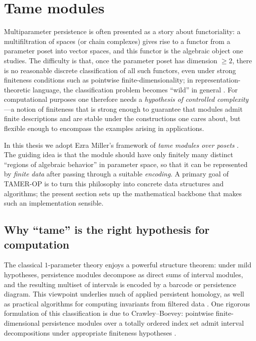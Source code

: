 \documentclass{article}
\newcommand{\<}{\langle}
\renewcommand{\>}{\rangle}
\theoremstyle{definition}
\theoremstyle{remark}
\begin{document}
	
	\section{Tame modules}
	\label{sec:tame-modules}
	
	Multiparameter persistence is often presented as a story about functoriality: a
	multifiltration of spaces (or chain complexes) gives rise to a functor from a parameter
	poset into vector spaces, and this functor is the algebraic object one studies.
	The difficulty is that, once the parameter poset has dimension $\ge 2$, there is no
	reasonable discrete classification of all such functors, even under strong finiteness
	conditions such as pointwise finite-dimensionality; in representation-theoretic language,
	the classification problem becomes ``wild'' in general \cite{CZ09}.
	For computational purposes one therefore needs a \emph{hypothesis of controlled
		complexity}---a notion of finiteness that is strong enough to guarantee that modules admit
	finite descriptions and are stable under the constructions one cares about, but flexible
	enough to encompass the examples arising in applications.
	
	In this thesis we adopt Ezra Miller's framework of \emph{tame modules over posets}
	\cite{Mil20}.  The guiding idea is that the module should have only finitely many
	distinct ``regions of algebraic behavior'' in parameter space, so that it can be
	represented by \emph{finite data} after passing through a suitable \emph{encoding}.
	A primary goal of TAMER-OP is to turn this philosophy into concrete data structures and
	algorithms; the present section sets up the mathematical backbone that makes such an
	implementation sensible.
	
	\subsection{Why ``tame'' is the right hypothesis for computation}
	\label{subsec:why-tame}
	
	The classical $1$-parameter theory enjoys a powerful structure theorem:
	under mild hypotheses, persistence modules decompose as direct sums of interval modules,
	and the resulting multiset of intervals is encoded by a barcode or persistence diagram.
	This viewpoint underlies much of applied persistent homology, as well as practical
	algorithms for computing invariants from filtered data \cite{ZC05}.
	One rigorous formulation of this classification is due to Crawley--Boevey:
	pointwise finite-dimensional persistence modules over a totally ordered index set admit
	interval decompositions under appropriate finiteness hypotheses \cite{CB15}.
	
\end{document}
